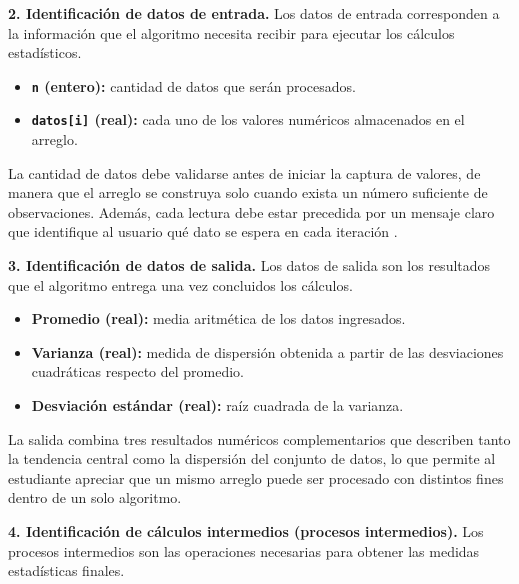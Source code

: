 \documentclass[12pt,twoside]{book}
\begin{document}
					\noindent
					\textbf{2. Identificación de datos de entrada.}
					Los datos de entrada corresponden a la información que el algoritmo necesita recibir para ejecutar los cálculos estadísticos.
					
					\begin{itemize}
						\item \textbf{\texttt{n} (entero):} cantidad de datos que serán procesados.
						\item \textbf{\texttt{datos[i]} (real):} cada uno de los valores numéricos almacenados en el arreglo.
					\end{itemize}
					
					\noindent
					La cantidad de datos debe validarse antes de iniciar la captura de valores, de manera que el arreglo se construya solo cuando exista un número suficiente de observaciones. Además, cada lectura debe estar precedida por un mensaje claro que identifique al usuario qué dato se espera en cada iteración \cite{Gaddis2022Starting,Farrell2018Programming}.
					
					\noindent
					\textbf{3. Identificación de datos de salida.}
					Los datos de salida son los resultados que el algoritmo entrega una vez concluidos los cálculos.
					
					\begin{itemize}
						\item \textbf{Promedio (real):} media aritmética de los datos ingresados.
						\item \textbf{Varianza (real):} medida de dispersión obtenida a partir de las desviaciones cuadráticas respecto del promedio.
						\item \textbf{Desviación estándar (real):} raíz cuadrada de la varianza.
					\end{itemize}
					
					\noindent
					La salida combina tres resultados numéricos complementarios que describen tanto la tendencia central como la dispersión del conjunto de datos, lo que permite al estudiante apreciar que un mismo arreglo puede ser procesado con distintos fines dentro de un solo algoritmo.
					
					\noindent
					\textbf{4. Identificación de cálculos intermedios (procesos intermedios).}
					Los procesos intermedios son las operaciones necesarias para obtener las medidas estadísticas finales.
					
\end{document}
